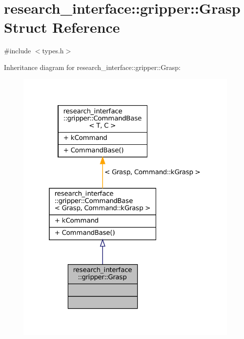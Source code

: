 \hypertarget{structresearch__interface_1_1gripper_1_1Grasp}{}\section{research\+\_\+interface\+:\+:gripper\+:\+:Grasp Struct Reference}
\label{structresearch__interface_1_1gripper_1_1Grasp}


{\ttfamily \#include $<$types.\+h$>$}



Inheritance diagram for research\+\_\+interface\+:\+:gripper\+:\+:Grasp\+:
\nopagebreak
\begin{figure}[H]
\begin{center}
\leavevmode
\includegraphics[width=313pt]{structresearch__interface_1_1gripper_1_1Grasp__inherit__graph}
\end{center}
\end{figure}


